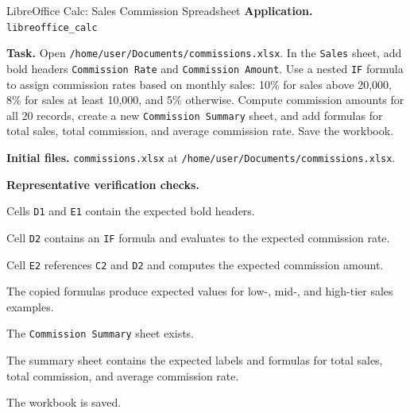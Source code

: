\documentclass{llmxive}
\providecommand{\taskfield}[1]{\vspace{0.25em}\noindent\textbf{#1.}}
\begin{document}
\begin{taskexample}{LibreOffice Calc: Sales Commission Spreadsheet}
\taskfield{Application} \texttt{libreoffice\_calc}

\taskfield{Task} Open \texttt{/home/user/Documents/commissions.xlsx}. In the
\texttt{Sales} sheet, add bold headers \texttt{Commission Rate} and
\texttt{Commission Amount}. Use a nested \texttt{IF} formula to assign
commission rates based on monthly sales: 10\% for sales above 20,000, 8\% for
sales at least 10,000, and 5\% otherwise. Compute commission amounts for all
20 records, create a new \texttt{Commission Summary} sheet, and add formulas
for total sales, total commission, and average commission rate. Save the
workbook.

\taskfield{Initial files}
\texttt{commissions.xlsx} at \texttt{/home/user/Documents/commissions.xlsx}.

\taskfield{Representative verification checks}
\begin{compactitem}
    \item Cells \texttt{D1} and \texttt{E1} contain the expected bold headers.
    \item Cell \texttt{D2} contains an \texttt{IF} formula and evaluates to
    the expected commission rate.
    \item Cell \texttt{E2} references \texttt{C2} and \texttt{D2} and computes
    the expected commission amount.
    \item The copied formulas produce expected values for low-, mid-, and
    high-tier sales examples.
    \item The \texttt{Commission Summary} sheet exists.
    \item The summary sheet contains the expected labels and formulas for total
    sales, total commission, and average commission rate.
    \item The workbook is saved.
\end{compactitem}
\end{taskexample}
\end{document}
